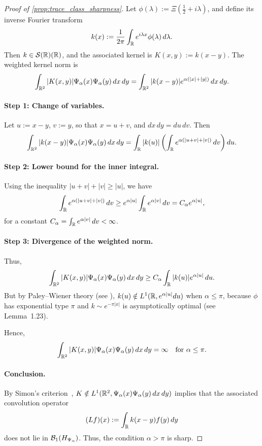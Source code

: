 \begin{proof}[Proof of \cref{prop:trace_class_sharpness}]
Let \( \phi(\lambda) := \Xi\left( \tfrac{1}{2} + i\lambda \right) \), and define its inverse Fourier transform
\[
k(x) := \frac{1}{2\pi} \int_{\mathbb{R}} e^{i\lambda x} \phi(\lambda)\, d\lambda.
\]
Then \( k \in \mathcal{S}(\mathbb{R})(\mathbb{R}) \), and the associated kernel is \( K(x, y) := k(x - y) \). The weighted kernel norm is
\[
\int_{\mathbb{R}^2} |K(x, y)| \Psi_\alpha(x) \Psi_\alpha(y) \, dx\,dy
= \int_{\mathbb{R}^2} |k(x - y)| e^{\alpha(|x| + |y|)} \, dx\,dy.
\]

\paragraph{Step 1: Change of variables.}
Let \( u := x - y \), \( v := y \), so that \( x = u + v \), and \( dx\,dy = du\,dv \). Then
\[
\int_{\mathbb{R}^2} |k(x - y)| \Psi_\alpha(x) \Psi_\alpha(y) \, dx\,dy
= \int_{\mathbb{R}} |k(u)| \left( \int_{\mathbb{R}} e^{\alpha(|u + v| + |v|)}\, dv \right) du.
\]

\paragraph{Step 2: Lower bound for the inner integral.}
Using the inequality \( |u + v| + |v| \ge |u| \), we have
\[
\int_{\mathbb{R}} e^{\alpha(|u + v| + |v|)}\, dv \ge e^{\alpha |u|} \int_{\mathbb{R}} e^{\alpha |v|}\, dv = C_\alpha e^{\alpha |u|},
\]
for a constant \( C_\alpha = \int_{\mathbb{R}} e^{\alpha |v|}\, dv < \infty \).

\paragraph{Step 3: Divergence of the weighted norm.}
Thus,
\[
\int_{\mathbb{R}^2} |K(x, y)| \Psi_\alpha(x) \Psi_\alpha(y) \, dx\,dy \ge C_\alpha \int_{\mathbb{R}} |k(u)| e^{\alpha |u|} \, du.
\]
But by Paley--Wiener theory (see \cite[Thm.~3.2.4]{Levin1996EntireLectures}), \( k(u) \notin L^1(\mathbb{R}, e^{\alpha |u|} du) \) when \( \alpha \le \pi \), because \( \phi \) has exponential type \( \pi \) and \( k \sim e^{-\pi |x|} \) is asymptotically optimal (see Lemma~1.23).

Hence,
\[
\int_{\mathbb{R}^2} |K(x, y)| \Psi_\alpha(x) \Psi_\alpha(y)\, dx\,dy = \infty \quad \text{for } \alpha \le \pi.
\]

\paragraph{Conclusion.}
By Simon’s criterion~\cite[Thm.~4.2]{Simon2005TraceIdeals}, \( K \notin L^1(\mathbb{R}^2, \Psi_\alpha(x)\Psi_\alpha(y)\,dx\,dy) \) implies that the associated convolution operator
\[
(Lf)(x) := \int_{\mathbb{R}} k(x - y) f(y) \, dy
\]
does not lie in \( \mathcal{B}_1(H_{\Psi_\alpha}) \). Thus, the condition \( \alpha > \pi \) is sharp.
\end{proof}
